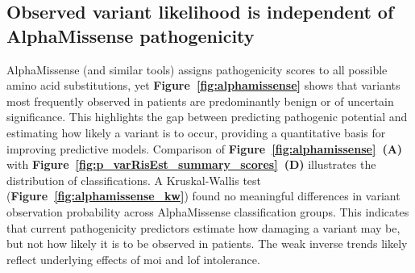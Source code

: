 
\subsection{Observed variant likelihood is independent of AlphaMissense pathogenicity}
AlphaMissense (and similar tools) assigns pathogenicity scores to all possible amino acid substitutions, yet \textbf{Figure~\ref{fig:alphamissense}} shows that variants most frequently observed in patients are predominantly benign or of uncertain significance. This highlights the gap between predicting pathogenic potential and estimating how likely a variant is to occur, providing a quantitative basis for improving predictive models.
Comparison of \textbf{Figure~\ref{fig:alphamissense}~(A)} with \textbf{Figure~\ref{fig:p_varRisEst_summary_scores}~(D)} illustrates the distribution of classifications.
A Kruskal-Wallis test (\textbf{Figure~\ref{fig:alphamissense_kw}}) found no meaningful differences in variant observation probability across AlphaMissense classification groups. This indicates that current pathogenicity predictors estimate how damaging a variant may be, but not how likely it is to be observed in patients. The weak inverse trends likely reflect underlying effects of \ac{moi} and \ac{lof} intolerance.

